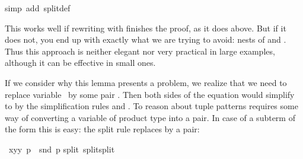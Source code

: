 \begin{isabellebody}
%
\endisadelimproof
%
\isatagproof
{}\isamarkupfalse%
{}simp\ add{}\ split{}def{}%
\endisatagproof
{\isafoldproof}%
%
\isadelimproof
%
\endisadelimproof
%
\begin{isamarkuptext}%
\noindent
This works well if rewriting with  finishes the
proof, as it does above.  But if it does not, you end up with exactly what
we are trying to avoid: nests of  and . Thus this
approach is neither elegant nor very practical in large examples, although it
can be effective in small ones.

If we consider why this lemma presents a problem, 
we realize that we need to replace variable~ by some pair .  Then both sides of the
equation would simplify to  by the simplification rules
 and .  
To reason about tuple patterns requires some way of
converting a variable of product type into a pair.
In case of a subterm of the form  this is easy: the split
rule  replaces  by a pair:%
%
\end{isamarkuptext}%
\isamarkuptrue%
\isamarkupfalse%
\ {}{}{}{}x{}y{}{}y{}\ p\ {}\ snd\ p{}\isanewline
%
\isadelimproof
%
\endisadelimproof
%
\isatagproof
{}\isamarkupfalse%
{}split\ split{}split{}%
\begin{isamarkuptxt}%
\begin{isabelle}%

\end{isabelle}
\end{isamarkuptxt}
\end{isabellebody}
